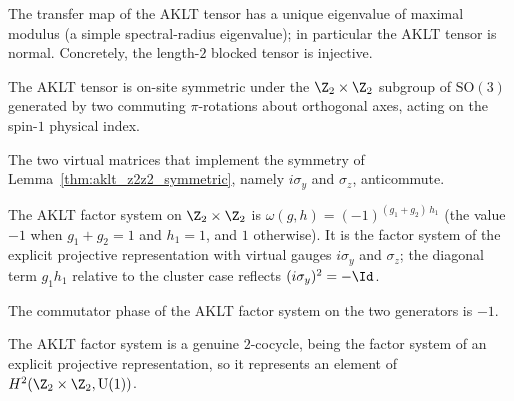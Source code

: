 \begin{lemma}\label{thm:aklt_normal}
    \leanok
    The transfer map of the AKLT tensor has a unique eigenvalue of
    maximal modulus (a simple spectral-radius eigenvalue); in
    particular the AKLT tensor is normal. Concretely, the
    length-$2$ blocked tensor is injective.
\end{lemma}

\begin{lemma}\label{thm:aklt_z2z2_symmetric}
    \leanok
    The AKLT tensor is on-site symmetric under the $\Z_2 \times \Z_2$ subgroup
    of $\mathrm{SO}(3)$ generated by two commuting $\pi$-rotations about
    orthogonal axes, acting on the spin-$1$ physical index.
\end{lemma}

\begin{lemma}\label{thm:aklt_gauge_anticomm}
    \leanok
    The two virtual matrices that implement the symmetry of
    Lemma~\ref{thm:aklt_z2z2_symmetric}, namely $i\sigma_y$ and $\sigma_z$,
    anticommute.
\end{lemma}

\begin{definition}\label{def:aklt_omega}
    \leanok
    The AKLT factor system on $\Z_2 \times \Z_2$ is
    $\omega(g,h) = (-1)^{(g_1 + g_2)\,h_1}$ (the value $-1$ when
    $g_1 + g_2 = 1$ and $h_1 = 1$, and $1$ otherwise). It is the factor
    system of the explicit projective representation with virtual gauges
    $i\sigma_y$ and $\sigma_z$; the diagonal term $g_1 h_1$ relative to the
    cluster case reflects $(i\sigma_y)^2 = -\Id$.
\end{definition}

\begin{lemma}\label{lem:aklt_comm_phase_neg_one}
    \leanok
    The commutator phase of the AKLT factor system on the two generators is $-1$.
\end{lemma}

\begin{lemma}\label{thm:aklt_omega_cocycle}
    \leanok
    The AKLT factor system is a genuine $2$-cocycle, being the factor system of an
    explicit projective representation, so it represents an element of
    $H^2(\Z_2 \times \Z_2, \mathrm{U}(1))$.
\end{lemma}

